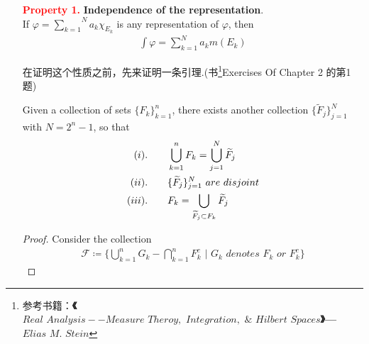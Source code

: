 	\begin{enumerate}
		\item[\textcolor{red}{\textbf{Property 1.}}]\textbf{Independence of the representation}.\\
		If $\varphi = \overset{N}{\underset{k = 1}{\sum}}{a_k \chi_{E_k}}$ is any representation of $\varphi$, then
		\begin{align}
			\int \varphi = \sum_{k = 1}^{N}{a_k m(E_k)}
		\end{align}
		
		\vspace{2em}
		在证明这个性质之前，先来证明一条引理.(书\footnote{参考书籍：\textbf{《$Real \,\, Analysis -- Measure \,\, Theroy, \,\, Integration, \,\, \& \,\, Hilbert \,\, Spaces$》--- $Elias \,\, M. \,\, Stein$}}Exercises Of Chapter 2 的第1题)
		
		\begin{lemma}\label{lemma 3.1.1}
			Given a collection of sets $\{ F_k \}_{k = 1}^{n}$, there exists another collection $\{ \widetilde{F}_j \}_{j = 1}^{N}$ \\
			with $N = 2^n - 1$, so that
			\begin{align}
				(\rmnum{1})&. \hspace*{2em} \bigcup_{k = 1}^{n}{F_k} = \bigcup_{j = 1}^{N}{\widetilde{F}_j} \\
				(\rmnum{2})&. \hspace*{2em} \{ \widetilde{F}_j \}_{j = 1}^{N} \,\, are \,\, disjoint \\
				(\rmnum{3})&. \hspace*{2em} F_k = \bigcup_{\widetilde{F}_j \subset F_k}{\widetilde{F}_j}
			\end{align}
		
			\vspace{2em}
			\begin{proof}
				Consider the collection
				\begin{align}
					\mathcal{F} \coloneqq \{ \bigcup_{k = 1}^{n}{G_k} - \bigcap_{k = 1}^{n}{F_{k}^{c}} \,\, \Big| \,\, G_k \,\, denotes \,\, F_k \,\, or \,\, F_{k}^c \}
				\end{align}
			\end{proof}
		\end{lemma}
	

\end{enumerate}
